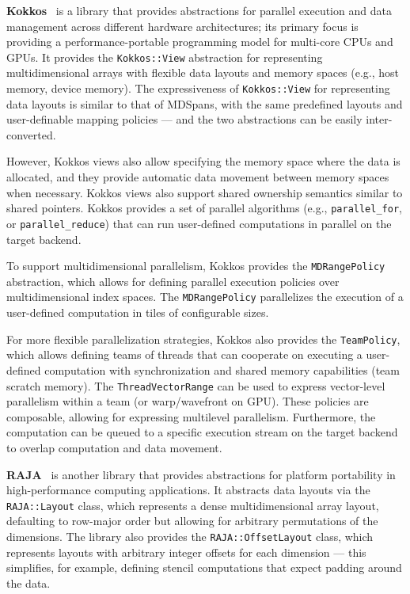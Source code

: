 \textbf{Kokkos}~\cite{trott2021kokkos} is a \cpp library that provides abstractions for parallel execution and data management across different hardware architectures; its primary focus is providing a performance-portable programming model for multi-core CPUs and GPUs\@. It provides the \lstinline{Kokkos::View} abstraction for representing multidimensional arrays with flexible data layouts and memory spaces (e.g., host memory, device memory). The expressiveness of \lstinline{Kokkos::View} for representing data layouts is similar to that of MDSpans\@, with the same predefined layouts and user-definable mapping policies --- and the two abstractions can be easily inter-converted.

However, Kokkos views also allow specifying the memory space where the data is allocated, and they provide automatic data movement between memory spaces when necessary. Kokkos views also support shared ownership semantics similar to \cpp shared pointers. Kokkos provides a set of parallel algorithms (e.g., \lstinline{parallel_for}, or \lstinline{parallel_reduce}) that can run user-defined computations in parallel on the target backend.

To support multidimensional parallelism, Kokkos provides the \lstinline{MDRangePolicy} abstraction, which allows for defining parallel execution policies over multidimensional index spaces. The \lstinline{MDRangePolicy} parallelizes the execution of a user-defined computation in tiles of configurable sizes.

For more flexible parallelization strategies, Kokkos also provides the \lstinline{TeamPolicy}, which allows defining teams of threads that can cooperate on executing a user-defined computation with synchronization and shared memory capabilities (team scratch memory). The \lstinline{ThreadVectorRange} can be used to express vector-level parallelism within a team (or warp/wavefront on GPU\@). These policies are composable, allowing for expressing multilevel parallelism. Furthermore, the computation can be queued to a specific execution stream on the target backend to overlap computation and data movement.

\textbf{RAJA}~\cite{beckingsale2019raja} is another \cpp library that provides abstractions for platform portability in high-performance computing applications. It abstracts data layouts via the \lstinline{RAJA::Layout} class, which represents a dense multidimensional array layout, defaulting to row-major order but allowing for arbitrary permutations of the dimensions. The library also provides the \lstinline{RAJA::OffsetLayout} class, which represents layouts with arbitrary integer offsets for each dimension --- this simplifies, for example, defining stencil computations that expect padding around the data.

